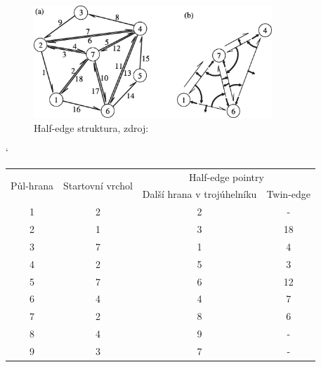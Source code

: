 \documentclass[12pt,a4paper]{article}
\begin{document}
\newpage
\begin{figure}[h!]
\centering
\includegraphics[width=0.8\textwidth]{img/half_edge2.png}
\caption{Half-edge struktura, zdroj: \cite{triangulation}}
\label{fig:half_edge_scan}
\end{figure}
\begin{table}[h!]
\catcode`
\begin{tabular}{|c||c||c|c|}
\hline
\multirow{2}{*}{Půl-hrana} & \multirow{2}{*}{Startovní vrchol} & \multicolumn{2}{c|}{Half-edge pointry} \\ \cline{3-4} 
                           &                                   & Další hrana v trojúhelníku & Twin-edge \\ \hline
1                          & 2                                 & 2                          & -         \\ \hline
2                          & 1                                 & 3                          & 18        \\ \hline
3                          & 7                                 & 1                          & 4         \\ \hline
4                          & 2                                 & 5                          & 3         \\ \hline
5                          & 7                                 & 6                          & 12        \\ \hline
6                          & 4                                 & 4                          & 7         \\ \hline
7                          & 2                                 & 8                          & 6         \\ \hline
8                          & 4                                 & 9                          & -         \\ \hline
9                          & 3                                 & 7                          & -         \\ \hline

\end{tabular}
\end{table}
\end{document}

